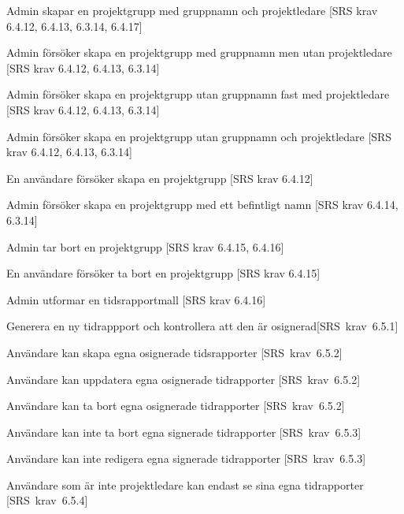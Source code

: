 \documentclass[a4paper]{article}
\begin{document}
\begin{appendices}
\begin{FT}
\item 
Admin skapar en projektgrupp med gruppnamn och projektledare [SRS krav 6.4.12, 6.4.13, 6.3.14, 6.4.17]

\item 
Admin försöker skapa en projektgrupp med gruppnamn men utan projektledare [SRS krav 6.4.12, 6.4.13, 6.3.14]

\item 
Admin försöker skapa en projektgrupp utan gruppnamn fast med projektledare [SRS krav 6.4.12, 6.4.13, 6.3.14]

\item 
Admin försöker skapa en projektgrupp utan gruppnamn och projektledare [SRS krav 6.4.12, 6.4.13, 6.3.14]

\item
En användare försöker skapa en projektgrupp [SRS krav 6.4.12]

\item 
Admin försöker skapa en projektgrupp med ett befintligt namn [SRS krav 6.4.14, 6.3.14]

\item
Admin tar bort en projektgrupp [SRS krav 6.4.15, 6.4.16]

\item
En användare försöker ta bort en projektgrupp [SRS krav 6.4.15]

\item 
Admin utformar en tidsrapportmall [SRS krav 6.4.16]


\item
Generera en ny tidrappport och kontrollera att den är osignerad[SRS~krav~6.5.1]

\item
Användare kan skapa egna osignerade tidsrapporter [SRS~krav~6.5.2]

\item
Användare kan uppdatera egna osignerade tidrapporter [SRS~krav~6.5.2]

\item
Användare kan ta bort egna osignerade tidrapporter [SRS~krav~6.5.2]

\item
Användare kan inte ta bort egna signerade tidrapporter [SRS~krav~6.5.3]

\item
Användare kan inte redigera egna signerade tidrapporter [SRS~krav~6.5.3]

\item
Användare som är inte projektledare kan endast se sina egna tidrapporter [SRS~krav~6.5.4]


\end{FT}
\end{appendices}
\end{document}
